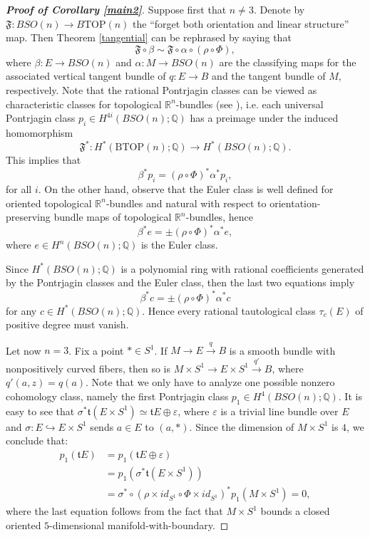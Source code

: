 \documentclass[onecolumn,notitlepage,11pt]{article}
\newcommand{\Q}{\mathbb{Q}}
\newcommand{\R}{\mathbb{R}}
\newcommand{\beq}{\begin{equation*}}
\newcommand{\eeq}{\end{equation*}}
\theoremstyle{definition}
\begin{document}
\begin{proof}[\textbf{Proof of Corollary \ref{main2}}]
Suppose first that $n\neq 3$. Denote
by $\mathfrak{F}:BSO(n)\to B\mbox{TOP}(n)$ the 
``forget both orientation and linear structure'' map.
Then Theorem \ref{tangential} can be rephrased by saying that 
\beq
\mathfrak{F}\circ\beta \sim
\mathfrak{F}\circ\alpha\circ (\rho\circ\Phi),
\eeq
where $\beta:E\to BSO(n)$ and $\alpha:M\to BSO(n)$ are the classifying
maps for the associated vertical tangent bundle of $q:E\to B$ and
the tangent bundle of $M$, respectively.
Note that the rational Pontrjagin classes can be viewed as 
characteristic classes for topological $\R^n$-bundles 
(see \cite{kirbysiebenmann}), i.e. each universal Pontrjagin
class $p_i\in H^{4i}(BSO(n);\Q)$ has a preimage under the
induced homomorphism
\beq
\mathfrak{F}^*:H^*(\mbox{BTOP}(n);\Q)\to H^*(BSO(n);\Q).
\eeq
This implies that 
\beq
\beta^*p_i=(\rho\circ\Phi)^*\alpha^*p_i,
\eeq
for all $i$.
On the other hand, observe that the Euler class is well defined
for oriented topological $\R^n$-bundles and natural with respect to
orientation-preserving bundle maps of topological $\R^n$-bundles, 
hence
\beq
\beta^*e=\pm(\rho\circ\Phi)^*\alpha^*e,
\eeq
where $e\in H^n(BSO(n);\Q)$ is the Euler class.

Since $H^*(BSO(n);\Q)$ is a polynomial 
ring with rational coefficients
generated by the Pontrjagin classes and the Euler class, then
the last two equations imply
\beq
\beta^*c=\pm(\rho\circ\Phi)^*\alpha^*c
\eeq
for any $c\in H^*(BSO(n);\Q)$. Hence every rational tautological
class $\tau_c(E)$ of positive degree must vanish.

Let now $n=3$. Fix a point $\ast\in S^1$.
If $M\to E\xrightarrow{q} B$ is a smooth bundle with
nonpositively curved fibers, then so is
$M\times S^1\to E\times S^1\xrightarrow{q'}B$,
where $q'(a,z)=q(a)$.  Note that we only
have to analyze one possible nonzero cohomology class, namely the
first Pontrjagin class $p_1\in H^4(BSO(n);\Q)$.  It is easy to see that 
$\sigma^*\mathfrak{t}(E\times S^1)\simeq\mathfrak{t}E\oplus\varepsilon$, where $\varepsilon$
is a trivial line bundle over $E$ and
$\sigma:E\hookrightarrow E\times S^1$ 
sends $a\in E$ to $(a,\ast)$. 
Since the dimension of $M\times S^1$ is $4$, we conclude that:
\begin{align*}
p_1(\mathfrak{t}E)&=p_1(\mathfrak{t}E\oplus\varepsilon)\\
				   &=p_1(\sigma^*\mathfrak{t}(E\times S^1))\\
				   &=\sigma^*\circ(\rho\times id_{S^1}\circ\Phi\times id_{S^1})^* p_1(M\times S^1)=0,
\end{align*}
where the last equation follows from the fact that 
$M\times S^1$ bounds a closed oriented $5$-dimensional
manifold-with-boundary.
\end{proof}
\end{document}
